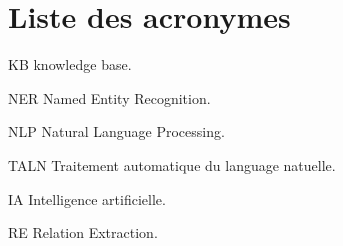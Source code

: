 \documentclass[
]{article}
\author{}
\date{}
\begin{document}
\section{Liste des acronymes}\label{liste-des-acronymes}

KB knowledge base.

NER Named Entity Recognition.

NLP Natural Language Processing.

TALN Traitement automatique du language natuelle.

IA Intelligence artificielle.

RE Relation Extraction.

\section{}\label{section}

\section{}\label{section-1}

\section{}\label{section-2}

\section{}\label{section-3}

\section{}\label{section-4}

\section{}\label{section-5}

\section{}\label{section-6}

\section{}\label{section-7}

\section{}\label{section-8}
\end{document}

